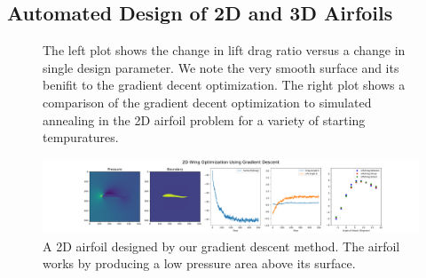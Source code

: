 \documentclass{article} %
\begin{document}
\subsection{Automated Design of 2D and 3D Airfoils}

\begin{figure}[h]
\begin{center}
\end{center}
\caption{The left plot shows the change in lift drag ratio versus a change in single design parameter. We note the very smooth surface and its benifit to the gradient decent optimization. The right plot shows a comparison of the gradient decent optimization to simulated annealing in the 2D airfoil problem for a variety of starting tempuratures.}
\end{figure}

\begin{figure}[h]
\begin{center}
\includegraphics[scale=0.25]{../test/figs/learn_gradient_descent.pdf}
\end{center}
\caption{A 2D airfoil designed by our gradient descent method. The airfoil works by producing a low pressure area above its surface.}
\end{figure}
\end{document}
